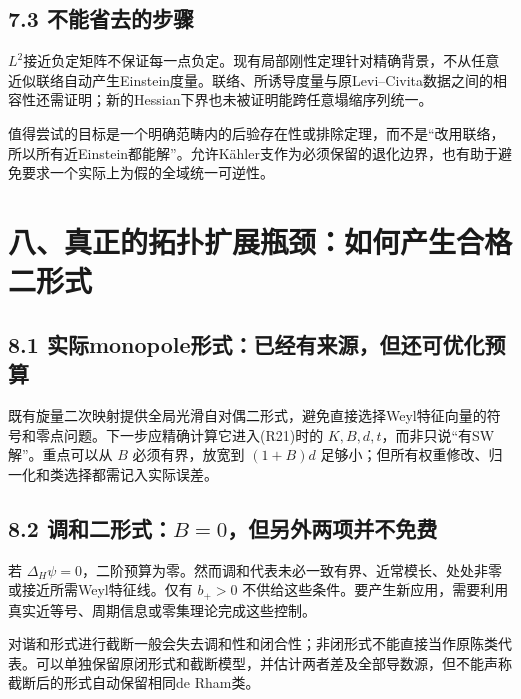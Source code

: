 \documentclass[
  11pt,
  a4paper,
  fontset=none]{ctexart}
\begin{document}
\subsection{7.3
不能省去的步骤}\label{ux4e0dux80fdux7701ux53bbux7684ux6b65ux9aa4}

\(L^2\)接近负定矩阵不保证每一点负定。现有局部刚性定理针对精确背景，不从任意近似联络自动产生Einstein度量。联络、所诱导度量与原Levi--Civita数据之间的相容性还需证明；新的Hessian下界也未被证明能跨任意塌缩序列统一。

值得尝试的目标是一个明确范畴内的后验存在性或排除定理，而不是``改用联络，所以所有近Einstein都能解''。允许Kähler支作为必须保留的退化边界，也有助于避免要求一个实际上为假的全域统一可逆性。

\section{八、真正的拓扑扩展瓶颈：如何产生合格二形式}\label{ux516bux771fux6b63ux7684ux62d3ux6251ux6269ux5c55ux74f6ux9888ux5982ux4f55ux4ea7ux751fux5408ux683cux4e8cux5f62ux5f0f}

\subsection{8.1
实际monopole形式：已经有来源，但还可优化预算}\label{ux5b9eux9645monopoleux5f62ux5f0fux5df2ux7ecfux6709ux6765ux6e90ux4f46ux8fd8ux53efux4f18ux5316ux9884ux7b97}

既有旋量二次映射提供全局光滑自对偶二形式，避免直接选择Weyl特征向量的符号和零点问题。下一步应精确计算它进入(R21)时的
\(K,B,d,t\)，而非只说``有SW解''。重点可以从 \(B\) 必须有界，放宽到
\((1+B)d\) 足够小；但所有权重修改、归一化和类选择都需记入实际误差。

\subsection{\texorpdfstring{8.2
调和二形式：\(B=0\)，但另外两项并不免费}{8.2 调和二形式：B=0，但另外两项并不免费}}\label{ux8c03ux548cux4e8cux5f62ux5f0fb0ux4f46ux53e6ux5916ux4e24ux9879ux5e76ux4e0dux514dux8d39}

若
\(\Delta_H\psi=0\)，二阶预算为零。然而调和代表未必一致有界、近常模长、处处非零或接近所需Weyl特征线。仅有
\(b_+>0\)
不供给这些条件。要产生新应用，需要利用真实近等号、周期信息或零集理论完成这些控制。

对谐和形式进行截断一般会失去调和性和闭合性；非闭形式不能直接当作原陈类代表。可以单独保留原闭形式和截断模型，并估计两者差及全部导数源，但不能声称截断后的形式自动保留相同de
Rham类。
\end{document}
